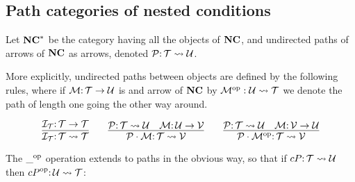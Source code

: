 \subsection{Path categories of nested conditions}

\begin{definition}
    Let $\mathbf{NC}^*$ be the category having all the objects of $\mathbf{NC}$, and undirected paths of arrows of $\mathbf{NC}$ as arrows, denoted ${\mathcal{P}}{:}\, {\mathcal{T}} \leadsto {\mathcal{U}}$. 

    More explicitly, undirected paths between objects are defined by the following rules, where if ${\mathcal{M}}{:}\, {\mathcal{T}} \rightarrow {\mathcal{U}}$ is and arrow of $\mathbf{NC}$ by ${{\mathcal{M}}}^{\mathrm{op}}: {\mathcal{U}} \leadsto {\mathcal{T}}$ we denote the path of length one going the other way around.

    $$ \infer{\cI_\cT\of \cT \leadsto \cT}{\cI_\cT\of \cT \to \cT} \qquad 
    \infer{\cP \cdot \cM \of \cT \leadsto \cV}{\cP\of \cT \leadsto \cU & \cM \of \cU \to \cV} \qquad 
    \infer{\cP \cdot \op{\cM} \of \cT \leadsto \cV}{\cP\of \cT \leadsto \cU & \cM \of \cV \to \cU}$$

    The ${\_}^{\mathrm{op}}$ operation extends to paths in the obvious way, so that if $cP{:}\, {\mathcal{T}} \leadsto {\mathcal{U}}$ then ${cP}^{\mathrm{op}}{:}\, {\mathcal{U}} \leadsto {\mathcal{T}}$:
    


\end{definition}

